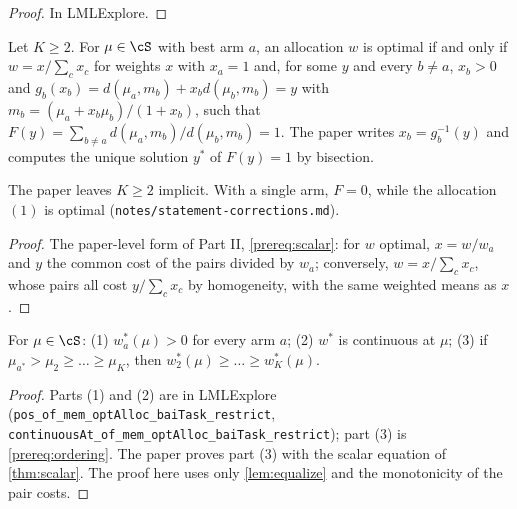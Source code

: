 \begin{proof}
  \leanok
  In LMLExplore.
\end{proof}

\begin{theorem}[{\cite[Theorem 5]{GK16}}]
  \label{thm:scalar}
  \leanok
  Let $K \ge 2$. For $\mu \in \cS$ with best arm $a$, an allocation $w$ is optimal if and only if
  $w = x / \sum_c x_c$ for weights $x$ with $x_a = 1$ and, for some $y$ and every $b \ne a$,
  $x_b > 0$ and $g_b(x_b) = d(\mu_a, m_b) + x_b d(\mu_b, m_b) = y$ with
  $m_b = (\mu_a + x_b\mu_b)/(1 + x_b)$, such that
  $F(y) = \sum_{b \ne a} d(\mu_a, m_b) / d(\mu_b, m_b) = 1$. The paper writes $x_b = g_b^{-1}(y)$
  and computes the unique solution $y^*$ of $F(y) = 1$ by bisection.

  The paper leaves $K \ge 2$ implicit. With a single arm, $F = 0$, while the allocation $(1)$ is
  optimal (\texttt{notes/statement-corrections.md}).
\end{theorem}

\begin{proof}
  \leanok
  The paper-level form of Part II, \cref{prereq:scalar}: for $w$ optimal, $x = w / w_a$ and $y$
  the common cost of the pairs divided by $w_a$; conversely, $w = x / \sum_c x_c$, whose pairs all
  cost $y / \sum_c x_c$ by homogeneity, with the same weighted means as $x$.
\end{proof}

\begin{proposition}[{\cite[Proposition 6]{GK16}}]
  \label{prop:optalloc}
  \leanok
  For $\mu \in \cS$:
  (1) $w^*_a(\mu) > 0$ for every arm $a$;
  (2) $w^*$ is continuous at $\mu$;
  (3) if $\mu_{a^*} > \mu_2 \ge \dots \ge \mu_K$, then $w^*_2(\mu) \ge \dots \ge w^*_K(\mu)$.
\end{proposition}

\begin{proof}
  \leanok
  Parts (1) and (2) are in LMLExplore (\texttt{pos\_of\_mem\_optAlloc\_baiTask\_restrict},
  \texttt{continuousAt\_of\_mem\_optAlloc\_baiTask\_restrict}); part (3) is
  \cref{prereq:ordering}. The paper proves part (3) with the scalar equation of
  \cref{thm:scalar}. The proof here uses only \cref{lem:equalize} and the monotonicity of the
  pair costs.
\end{proof}

